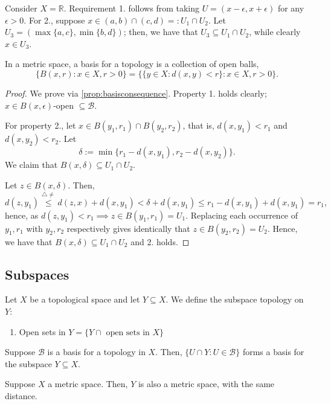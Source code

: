 \begin{example}
    Consider $X = \mathbb{R}$. Requirement 1. follows from taking $U = (x - \epsilon, x + \epsilon)$ for any $\epsilon > 0$. For 2., suppose $x \in (a, b) \cap (c, d) =: U_1 \cap U_2$. Let $U_3 = (\max \{a, c\}, \min \{b, d\})$; then, we have that $U_3 \subseteq U_1 \cap U_2$, while clearly $x \in U_3$.
\end{example}

\begin{proposition}
    In a metric space, a basis for a topology is a collection of open balls, \[
    \{B(x, r) : x \in X, r > 0\} = \{\{y \in X : d(x, y) < r\} : x \in X , r > 0\}.
    \]
\end{proposition}

\begin{proof}
    We prove via \cref{prop:basisconsequence}. Property 1. holds clearly; $x\in B(x, \epsilon)$-open $\subseteq \mathcal{B}$.

    For property 2., let $x \in B(y_1, r_1) \cap B(y_2, r_2)$, that is, $d(x, y_1) < r_1$ and $d(x, y_2) < r_2$. Let $$\delta := \min \{r_1 - d(x, y_1), r_2 - d(x, y_2)\}.$$ We claim that $B(x, \delta) \subseteq U_1 \cap U_2$.

    Let $z \in B(x, \delta)$. Then, \[
    d(z, y_1) \overset{\triangle \neq}{\leq} d(z, x) + d(x, y_1) < \delta + d(x, y_1) \leq r_1 - d(x, y_1) + d(x, y_1) = r_1,   
    \]
    hence, as $d(z, y_1) < r_1 \implies z \in B(y_1, r_1) = U_1$. Replacing each occurrence of $y_1, r_1$ with $y_2, r_2$ respectively gives identically that $z \in B(y_2, r_2) = U_2$. Hence, we have that $B(x, \delta) \subseteq U_1 \cap U_2$ and 2. holds.
\end{proof}

\subsection{Subspaces}

\begin{definition}
    Let $X$ be a topological space and let $Y \subseteq X$. We define the subspace topology on $Y$:
    \begin{enumerate}
        \item Open sets in $Y = \{Y \cap \text{ open sets in } X\}$
    \end{enumerate}
\end{definition}

\begin{proposition}
    Suppose $\mathcal{B}$ is a basis for a topology in $X$. Then, $\{U \cap Y : U \in \mathcal{B}\}$ forms a basis for the subspace $Y \subseteq X$.

    Suppose $X$ a metric space. Then, $Y$ is also a metric space, with the same distance.
\end{proposition}

